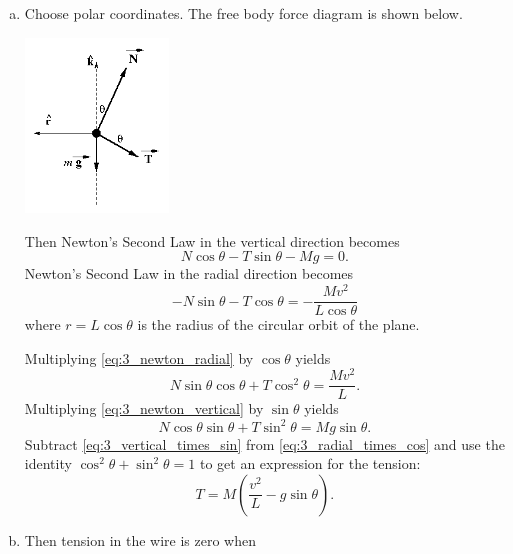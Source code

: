 \documentclass{esg8012exam}
\begin{document}
\begin{solution}
  \begin{enumerate}[(a)]
    \item Choose polar coordinates. The free body force diagram is shown below. 
      \begin{center}\includegraphics[width=0.3\textwidth]{exam1_s3_1}\end{center}
      Then Newton's Second Law in the vertical direction becomes
      \begin{equation}
        N\cos\theta - T\sin\theta - M g = 0. \label{eq:3_newton_vertical}
      \end{equation}
      Newton's Second Law in the radial direction becomes
      \begin{equation}
        - N \sin\theta - T \cos\theta = -\frac{M v^2}{L \cos\theta} \label{eq:3_newton_radial}
      \end{equation}
      where $r = L\cos\theta$ is the radius of the circular orbit of the plane. 
      \par
      Multiplying \autoref{eq:3_newton_radial} by $\cos\theta$ yields
      \begin{equation}
        N\sin\theta\cos\theta + T \cos^2 \theta = \frac{M v^2}{L}. \label{eq:3_radial_times_cos}
      \end{equation}
      Multiplying \autoref{eq:3_newton_vertical} by $\sin\theta$ yields
      \begin{equation}
        N\cos\theta\sin\theta + T \sin^2 \theta = M g\sin\theta. \label{eq:3_vertical_times_sin}
      \end{equation}
      Subtract \autoref{eq:3_vertical_times_sin} from \autoref{eq:3_radial_times_cos} and use the identity $\cos^2\theta + \sin^2\theta = 1$ to get an expression for the tension:
      \begin{equation}
        T = M\left(\frac{v^2}{L} - g \sin\theta\right). \label{eq:3_tension}
      \end{equation}
    \item Then tension in the wire is zero when 

\end{enumerate}
\end{solution}
\end{document}
